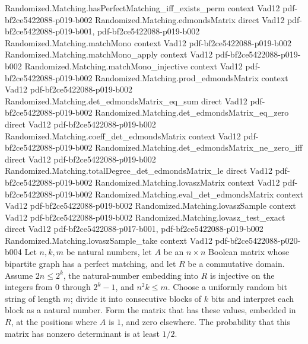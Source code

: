 \begin{theorem}
\proofstep
  {Randomized.Matching.hasPerfectMatching_iff_exists_perm}
  {context}
  {Vad12}
  {pdf-bf2ce5422088-p019-b002}
\proofstep
  {Randomized.Matching.edmondsMatrix}
  {direct}
  {Vad12}
  {pdf-bf2ce5422088-p019-b001,
    pdf-bf2ce5422088-p019-b002}
\proofstep
  {Randomized.Matching.matchMono}
  {context}
  {Vad12}
  {pdf-bf2ce5422088-p019-b002}
\proofstep
  {Randomized.Matching.matchMono_apply}
  {context}
  {Vad12}
  {pdf-bf2ce5422088-p019-b002}
\proofstep
  {Randomized.Matching.matchMono_injective}
  {context}
  {Vad12}
  {pdf-bf2ce5422088-p019-b002}
\proofstep
  {Randomized.Matching.prod_edmondsMatrix}
  {context}
  {Vad12}
  {pdf-bf2ce5422088-p019-b002}
\proofstep
  {Randomized.Matching.det_edmondsMatrix_eq_sum}
  {direct}
  {Vad12}
  {pdf-bf2ce5422088-p019-b002}
\proofstep
  {Randomized.Matching.det_edmondsMatrix_eq_zero}
  {direct}
  {Vad12}
  {pdf-bf2ce5422088-p019-b002}
\proofstep
  {Randomized.Matching.coeff_det_edmondsMatrix}
  {context}
  {Vad12}
  {pdf-bf2ce5422088-p019-b002}
\proofstep
  {Randomized.Matching.det_edmondsMatrix_ne_zero_iff}
  {direct}
  {Vad12}
  {pdf-bf2ce5422088-p019-b002}
\proofstep
  {Randomized.Matching.totalDegree_det_edmondsMatrix_le}
  {direct}
  {Vad12}
  {pdf-bf2ce5422088-p019-b002}
\proofstep
  {Randomized.Matching.lovaszMatrix}
  {context}
  {Vad12}
  {pdf-bf2ce5422088-p019-b002}
\proofstep
  {Randomized.Matching.eval_det_edmondsMatrix}
  {context}
  {Vad12}
  {pdf-bf2ce5422088-p019-b002}
\proofstep
  {Randomized.Matching.lovaszSample}
  {context}
  {Vad12}
  {pdf-bf2ce5422088-p019-b002}
\proofstep
  {Randomized.Matching.lovasz_test_exact}
  {direct}
  {Vad12}
  {pdf-bf2ce5422088-p017-b001,
    pdf-bf2ce5422088-p019-b002}
\proofstep
  {Randomized.Matching.lovaszSample_take}
  {context}
  {Vad12}
  {pdf-bf2ce5422088-p020-b004}
Let $n,k,m$ be natural numbers, let $A$ be an $n\times n$ Boolean matrix whose bipartite
graph has a perfect matching, and let $R$ be a commutative domain. Assume $2n\le 2^k$,
the natural-number embedding into $R$ is injective on the integers from $0$ through
$2^k-1$, and $n^2k\le m$. Choose a uniformly random bit string of length $m$; divide it
into consecutive blocks of $k$ bits and interpret each block as a natural number. Form
the matrix that has these values, embedded in $R$, at the positions where $A$ is $1$,
and zero elsewhere. The probability that this matrix has nonzero determinant is at least
$1/2$.
\end{theorem}

